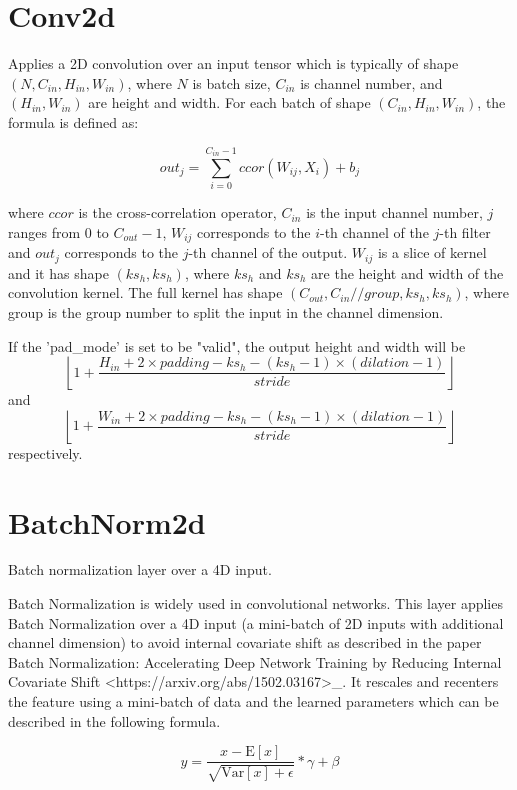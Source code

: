 \documentclass{article}
\begin{document}
    \section{Conv2d}
    Applies a 2D convolution over an input tensor which is typically of shape $(N, C_{in}, H_{in}, W_{in})$,
    where $N$ is batch size, $C_{in}$ is channel number, and $(H_{in}, W_{in})$ are height and width.
    For each batch of shape $(C_{in}, H_{in}, W_{in})$, the formula is defined as:

    $$out_j = \sum_{i=0}^{C_{in} - 1} ccor(W_{ij}, X_i) + b_j$$

    where $ccor$ is the cross-correlation operator, $C_{in}$ is the input channel number, $j$ ranges
    from $0$ to $C_{out} - 1$, $W_{ij}$ corresponds to the $i$-th channel of the $j$-th
    filter and $out_{j}$ corresponds to the $j$-th channel of the output. $W_{ij}$ is a slice
    of kernel and it has shape $( ks_h, ks_h)$, where $ ks_h$ and
    $ ks_h$ are the height and width of the convolution kernel. The full kernel has shape
    $(C_{out}, C_{in} // group, ks_h, ks_h)$, where group is the group number
    to split the input in the channel dimension.

    If the 'pad\_mode' is set to be "valid", the output height and width will be
    $$\left \lfloor{1 + \frac{H_{in} + 2 \times  padding - ks_h - ( ks_h - 1) \times ( dilation - 1) }{ stride}} \right \rfloor$$
    and
    $$\left \lfloor{1 + \frac{W_{in} + 2 \times  padding - ks_h - ( ks_h - 1) \times ( dilation - 1) }{ stride}} \right \rfloor$$    respectively.


    \section{BatchNorm2d}
    Batch normalization layer over a 4D input.

    Batch Normalization is widely used in convolutional networks. This layer
    applies Batch Normalization over a 4D input (a mini-batch of 2D inputs with
    additional channel dimension) to avoid internal covariate shift as described
    in the paper Batch Normalization: Accelerating Deep Network Training by
    Reducing Internal Covariate Shift <https://arxiv.org/abs/1502.03167>\_. It
    rescales and recenters the feature using a mini-batch of data and
    the learned parameters which can be described in the following formula.

    $$y = \frac{x - \mathrm{E}[x]}{\sqrt{\mathrm{Var}[x] + \epsilon}} * \gamma + \beta$$
\end{document}
